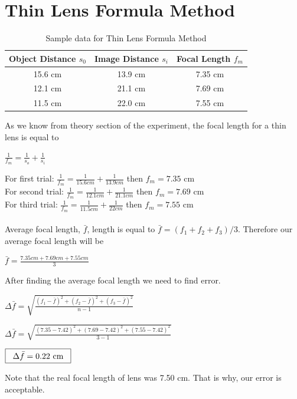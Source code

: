 \documentclass[a4paper,12pt]{report}
\begin{document}
\section{Thin Lens Formula Method}
\begin{table}[h]
\begin{center}
\begin{tabular}{|c|c|c|}
	\hline Object Distance $s_{0}$ & Image Distance $s_{i}$ & Focal Length $f_{m}$\\ 
	\hline 15.6 cm & 13.9 cm & 7.35 cm \\ 
	\hline 12.1 cm & 21.1 cm & 7.69 cm \\ 
	\hline 11.5 cm & 22.0 cm & 7.55 cm \\ 
	\hline 
\end{tabular} 
\end{center}
\caption{Sample data for Thin Lens Formula Method}
\end{table}
As we know from theory section of the experiment, the focal length for a thin lens is equal to
\begin{center}
	$\frac{1}{f_{m}}=\frac{1}{s_{o}}+\frac{1}{s_{i}}$
\end{center}
For first trial: $\frac{1}{f_{m}}=\frac{1}{15.6 cm}+\frac{1}{13.9cm}$ then $f_{m}=7.35$ cm\\
For second trial: $\frac{1}{f_{m}}=\frac{1}{12.1 cm}+\frac{1}{21.1cm}$ then $f_{m}=7.69$ cm\\
For third trial: $\frac{1}{f_{m}}=\frac{1}{11.5 cm}+\frac{1}{22cm}$ then $f_{m}=7.55$ cm\\\\
Average focal length, $\bar{f}$, length is equal to $\bar{f}=(f_{1}+f_{2}+f_{3})/3$. Therefore our average focal length will be
\begin{center}
	$\bar{f}=\frac{7.35 cm+7.69cm+7.55cm}{3}$\\
\end{center}
\begin{center}
\end{center}
After finding the average focal length we need to find error.
\begin{center}
	$\Delta\bar{f}=\sqrt{\frac{(f_{1}-\bar{f})^{2}+(f_{2}-\bar{f})^{2}+(f_{3}-\bar{f})^{2}}{n-1}}$
\end{center}
\begin{center}
	$\Delta\bar{f}=\sqrt{\frac{(7.35-7.42)^{2}+(7.69-7.42)^{2}+(7.55-7.42)^{2}}{3-1}}$
\end{center}
\begin{center}
	$\framebox[80pt]{$ \Delta \bar{f}=0.22$ cm}$
\end{center}
Note that the real focal length of lens was 7.50 cm. That is why, our error is acceptable.
\end{document}
